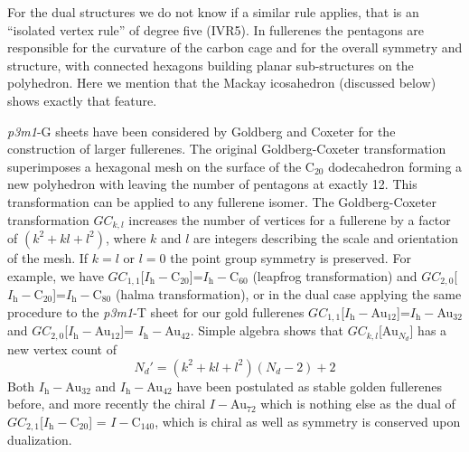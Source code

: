 For the dual structures we do not know if a similar rule applies, that is an
``isolated vertex rule'' of degree five (IVR5). In fullerenes the pentagons are
responsible for the curvature of the carbon cage and for the overall symmetry
and structure, with connected hexagons building planar sub-structures on the
polyhedron. Here we mention that the Mackay icosahedron (discussed below) shows
exactly that feature.

\textit{p3m1}-G sheets have been considered by Goldberg and Coxeter for the
construction of larger
fullerenes.\autocite{Goldberg_ClassMultiSymmetricPolyhedra_1937,Coxeter-1971,Dutour_GoldbergCoxeterConstructionvalent_2004}
The original Goldberg-Coxeter transformation superimposes a hexagonal mesh on
the surface of the C$_{20}$ dodecahedron forming a new polyhedron with leaving
the number of pentagons at exactly
12.\autocite{Goldberg_ClassMultiSymmetricPolyhedra_1937,Coxeter-1971} This
transformation can be applied to any fullerene
isomer.\autocite{Schwerdtfeger_topologyfullerenes_2015} The Goldberg-Coxeter
transformation $GC_{k,l}$ increases the number of vertices for a fullerene by a
factor of $(k^2+kl+l^2)$, where $k$ and $l$ are integers describing the scale
and orientation of the
mesh.\autocite{Dutour_GoldbergCoxeterConstructionvalent_2004,Schwerdtfeger_topologyfullerenes_2015}
If $k=l$ or $l=0$ the point group symmetry is preserved. For example, we have
$GC_{1,1}$[$I_\mathrm{h}-$C$_{20}$]=$I_\mathrm{h}-$C$_{60}$ (leapfrog
transformation)\autocite{Fowler-atlas-2006} and
$GC_{2,0}$[$I_\mathrm{h}-$C$_{20}$]=$I_\mathrm{h}-$C$_{80}$ (halma transformation), or in the
dual case applying the same procedure to the \textit{p3m1}-T sheet for our gold
fullerenes $GC_{1,1}$[$I_\mathrm{h}-$Au$_{12}$]=$I_\mathrm{h}-$Au$_{32}$ and
$GC_{2,0}$[$I_\mathrm{h}-$Au$_{12}$]= $I_\mathrm{h}-$Au$_{42}$. Simple algebra shows that
$GC_{k,l}$[Au$_{N_d}$] has a new vertex count of
%
\begin{equation}
  \label{eq:dualvertex} 
N_d'=(k^2+kl+l^2)(N_d-2)+2 
\end{equation}
%
Both $I_\mathrm{h}-$Au$_{32}$ and $I_\mathrm{h}-$Au$_{42}$ have been postulated as stable golden
fullerenes before,\autocite{Johansson_Au3224CaratGolden_2004} and more recently
the chiral $I-$Au$_{72}$\autocite{Karttunen_IcosahedralAu72_2008} which is
nothing else as the dual of $GC_{2,1}$[$I_\mathrm{h}-$C$_{20}$] = $I-$C$_{140}$, which
is chiral as well as symmetry is conserved upon dualization.

